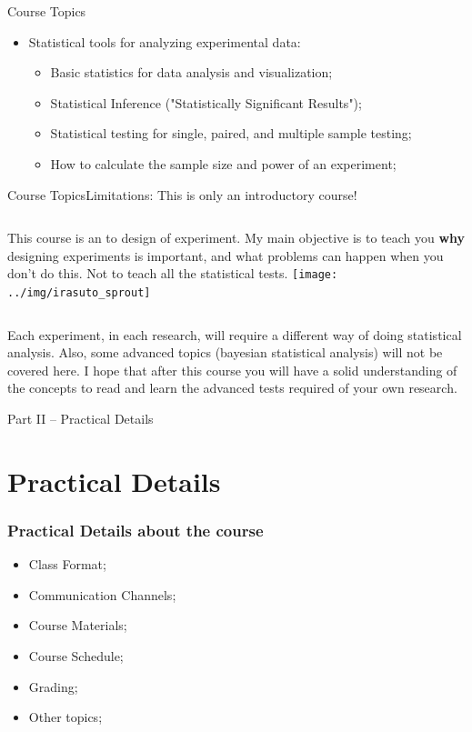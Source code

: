 \documentclass[aspectratio=169]{beamer}
\begin{document}
\begin{CJK}{UTF8}{ipxm}
\begin{frame}{Course Topics}
\begin{itemize}
    \item Statistical tools for analyzing experimental data:
    \begin{itemize}
      \item Basic statistics for data analysis and visualization;
      \item Statistical Inference ("Statistically Significant Results");
      \item Statistical testing for single, paired, and multiple sample testing;
      \item How to calculate the sample size and power of an experiment;
    \end{itemize}
  \end{itemize}
\end{frame}

\begin{frame}{Course Topics}{Limitations: This is only an introductory course!}

  \begin{columns}
    This course is an  to design of
    experiment. My main objective is to teach you {\bf why} designing
    experiments is important, and what problems can happen when you
    don't do this. Not to teach all the statistical tests.
      \texttt{[image: ../img/irasuto\_sprout]}
  \end{columns}
  \vfill

  Each experiment, in each research, will require a different way of
  doing statistical analysis. Also, some advanced topics (bayesian
  statistical analysis) will not be covered here. I hope that after
  this course you will have a solid understanding of the concepts to
  read and learn the advanced tests required of your own research.
\end{frame}

\begin{frame}
  \begin{center}
    Part II -- Practical Details
  \end{center}
\end{frame}

\section{Practical Details}
\begin{frame}
  \frametitle{Practical Details about the course}
  \begin{itemize}
    \item Class Format;
    \item Communication Channels;
    \item Course Materials;
    \item Course Schedule;
    \item Grading;
    \item Other topics;
  \end{itemize}\vfill


\end{frame}
\end{CJK}
\end{document}
